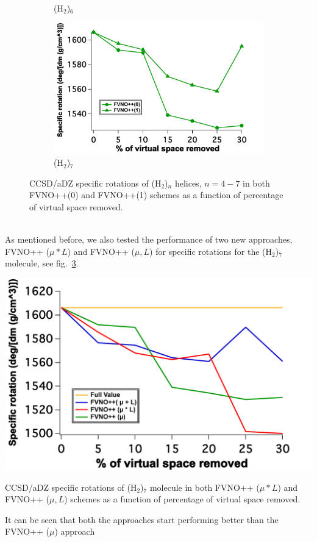 \begin{figure}
\begin{subfigure}{.5\textwidth}
  \caption{(H$_2$)$_6$}
  \label{fig:sfig2}
\end{subfigure}
\begin{subfigure}{.5\textwidth}
  \centering
  \includegraphics[width=.9\linewidth]{figures_fvno++/fvno++_cc2_1_h2_7_adz_optrot_lg.pdf}
  \caption{(H$_2$)$_7$}
  \label{fig:sfig2}
\end{subfigure}
\caption{{\footnotesize CCSD/aDZ specific rotations of
(H$_2$)$_n$ helices, $ n = 4-7$ in both FVNO++(0) and FVNO++(1) schemes as a function of
percentage of virtual space removed.}}
\label{fig:fvno++_optrot_opt_h2_n}
\end{figure}
\\
As mentioned before, we also tested the performance of two new approaches, FVNO++ ($\mu * L$)
and FVNO++ ($\mu,L$) for specific rotations for the (H$_2$)$_7$ molecule, see fig.~\ref{fig:fvno++_optrot_opt_h2_n}.
\begin{MyFigure}[h!]
\centering
\includegraphics[width=0.6\linewidth]{figures_fvno++/fvno++_optrot_2_approaches}
\caption{{\footnotesize CCSD/aDZ specific rotations of
(H$_2$)$_7$ molecule in both FVNO++ ($\mu * L$) and FVNO++ ($\mu,L$) schemes as a function of
percentage of virtual space removed.}}
\label{fig:fvno++_optrot_2_approaches}
\end{MyFigure}
It can be seen that both the approaches start performing better than the FVNO++ ($\mu$) approach 
